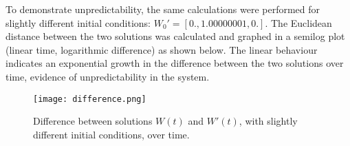 \documentclass[12pt,a4paper]{article}
\begin{document}
To demonstrate unpredictability, the same calculations were performed for slightly different initial conditions: $W_0' = [0., 1.00000001, 0.]$. The Euclidean distance between the two solutions was calculated and graphed in a semilog plot (linear time, logarithmic difference) as shown below. The linear behaviour indicates an exponential growth in the difference between the two solutions over time, evidence of unpredictability in the system.

\begin{figure}[htbp!]
\begin{center}
\texttt{[image: difference.png]}
\end{center}
\caption{Difference between solutions $W(t)$ and $W'(t)$, with slightly different initial conditions, over time.}
\label{fig:difference}
\end{figure}
\end{document}
